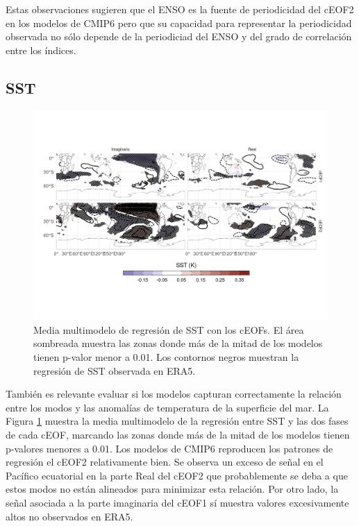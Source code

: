 \documentclass[12pt,oneside]{reedthesis}
\begin{document}
Estas observaciones sugieren que el ENSO es la fuente de periodicidad del cEOF2 en los modelos de CMIP6 pero que su capacidad para representar la periodicidad observada no sólo depende de la periodiciad del ENSO y del grado de correlación entre los índices.

\hypertarget{sst}{%
\subsection{SST}\label{sst}}



\begin{figure}
\includegraphics{figures/50-cmip6/sst-mmm-1} \caption{Media multimodelo de regresión de SST con los cEOFs. El área sombreada muestra las zonas donde más de la mitad de los modelos tienen p-valor menor a 0.01. Los contornos negros muestran la regresión de SST observada en ERA5.}\label{fig:sst-mmm}
\end{figure}

También es relevante evaluar si los modelos capturan correctamente la relación entre los modos y las anomalías de temperatura de la superficie del mar.
La Figura \ref{fig:sst-mmm} muestra la media multimodelo de la regresión entre SST y las dos fases de cada cEOF, marcando las zonas donde más de la mitad de los modelos tienen p-valores menores a 0.01.
Los modelos de CMIP6 reproducen los patrones de regresión el cEOF2 relativamente bien.
Se observa un exceso de señal en el Pacífico ecuatorial en la parte Real del cEOF2 que probablemente se deba a que estos modos no están alineados para minimizar esta relación.
Por otro lado, la señal asociada a la parte imaginaria del cEOF1 sí muestra valores excesivamente altos no observados en ERA5.
\end{document}

